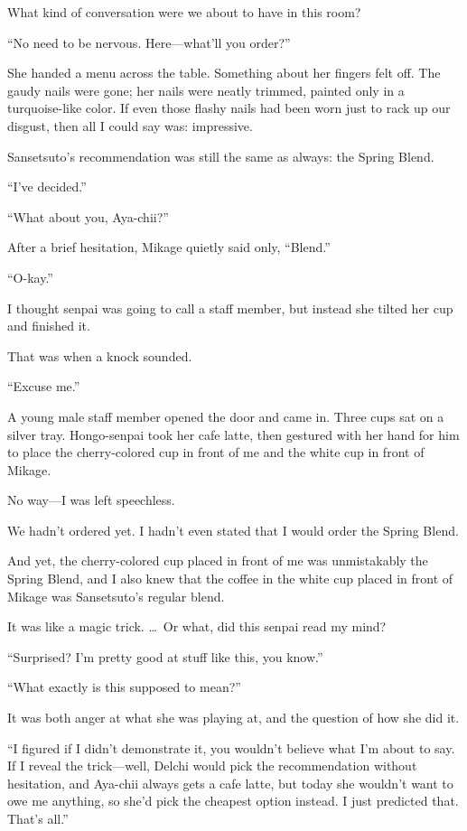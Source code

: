 \documentclass[
    a4paper,
    12pt,
    twoside,
    openany,
    UTF8,
    fontset=windows
]{ctexbook}
\begin{document}
What kind of conversation were we about to have in this room?

``No need to be nervous. Here---what'll you order?''

She handed a menu across the table. Something about her fingers felt off. The gaudy nails were gone; her nails were neatly trimmed, painted only in a turquoise-like color. If even those flashy nails had been worn just to rack up our disgust, then all I could say was: impressive.

Sansetsuto's recommendation was still the same as always: the Spring Blend.

``I've decided.''

``What about you, Aya-chii?''

After a brief hesitation, Mikage quietly said only, ``Blend.''

``O-kay.''

I thought senpai was going to call a staff member, but instead she tilted her cup and finished it.

That was when a knock sounded.

``Excuse me.''

A young male staff member opened the door and came in. Three cups sat on a silver tray. Hongo-senpai took her cafe latte, then gestured with her hand for him to place the cherry-colored cup in front of me and the white cup in front of Mikage.

No way---I was left speechless.

We hadn't ordered yet. I hadn't even stated that I would order the Spring Blend.

And yet, the cherry-colored cup placed in front of me was unmistakably the Spring Blend, and I also knew that the coffee in the white cup placed in front of Mikage was Sansetsuto's regular blend.

It was like a magic trick. \dots\ Or what, did this senpai read my mind?

``Surprised? I'm pretty good at stuff like this, you know.''

``What exactly is this supposed to mean?''

It was both anger at what she was playing at, and the question of how she did it.

``I figured if I didn't demonstrate it, you wouldn't believe what I'm about to say. If I reveal the trick---well, Delchi would pick the recommendation without hesitation, and Aya-chii always gets a cafe latte, but today she wouldn't want to owe me anything, so she'd pick the cheapest option instead. I just predicted that. That's all.''
\end{document}

